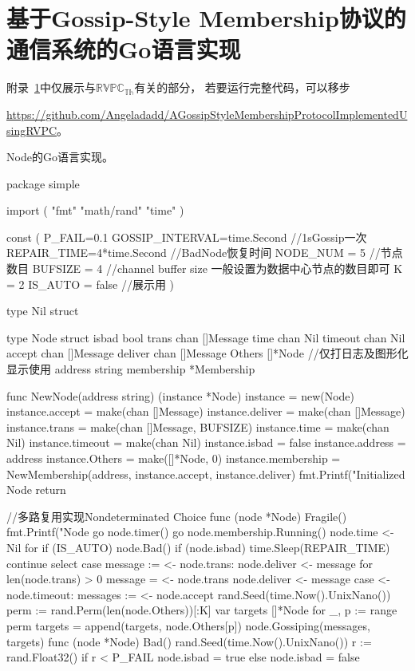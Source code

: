 \chapter{基于Gossip-Style Membership协议的通信系统的Go语言实现}\label{app:code}
附录~\ref{app:code}中仅展示与$\mathbb{RVPC}_{\mathbb{Th}}$有关的部分，
若要运行完整代码，可以移步

\url{https://github.com/Angeladadd/AGossipStyleMembershipProtocolImplementedUsingRVPC}。

Node的Go语言实现。
\begin{codeblock}[language=GO]
	package simple

	import (
		"fmt"
		"math/rand"
		"time"
	)
	
	const (
		P_FAIL=0.1
		GOSSIP_INTERVAL=time.Second //1sGossip一次
		REPAIR_TIME=4*time.Second //BadNode恢复时间
		NODE_NUM = 5 //节点数目
		BUFSIZE = 4 //channel buffer size 一般设置为数据中心节点的数目即可
		K = 2
		IS_AUTO = false //展示用
	)
	
	type Nil struct {}
	
	type Node struct {
		isbad bool
		trans chan []Message
		time chan Nil
		timeout chan Nil
		accept chan []Message
		deliver chan []Message
		Others []*Node
		//仅打日志及图形化显示使用
		address string
		membership *Membership
	}
	
	func NewNode(address string) (instance *Node) {
		instance = new(Node)
		instance.accept = make(chan []Message)
		instance.deliver = make(chan []Message)
		instance.trans = make(chan []Message, BUFSIZE)
		instance.time = make(chan Nil)
		instance.timeout = make(chan Nil)
		instance.isbad = false
		instance.address = address
		instance.Others = make([]*Node, 0)
		instance.membership = NewMembership(address, instance.accept, instance.deliver)
		fmt.Printf("Initialized Node %
		return
	}
	
	//多路复用实现Nondeterminated Choice
	func (node *Node) Fragile() {
		fmt.Printf("Node %
		go node.timer()
		go node.membership.Running()
		node.time <- Nil{}
		for {
			if (IS_AUTO) {
				node.Bad()
			}
			if (node.isbad) {
				time.Sleep(REPAIR_TIME)
				continue
			}
			select {
			case message := <- node.trans:
				node.deliver <- message
				for len(node.trans) > 0 {
					message = <- node.trans
					node.deliver <- message
				}
			case <- node.timeout:
				messages := <- node.accept
				rand.Seed(time.Now().UnixNano())
				perm := rand.Perm(len(node.Others))[:K]
				var targets []*Node
				for _, p := range perm {
					targets = append(targets, node.Others[p])
				}
				node.Gossiping(messages, targets)
			}
		}
	}
	func (node *Node) Bad() {
		rand.Seed(time.Now().UnixNano())
			r := rand.Float32()
			if r < P_FAIL {
				node.isbad = true
			} else {
				node.isbad = false
			}
	}
	

\end{codeblock}
